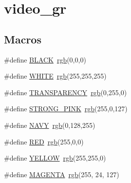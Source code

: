 \hypertarget{group__video__gr}{}\section{video\+\_\+gr}
\label{group__video__gr}
\subsection*{Macros}
\begin{DoxyCompactItemize}
\item 
\#define \hyperlink{group__video__gr_ga7b3b25cba33b07c303f3060fe41887f6}{B\+L\+A\+CK}~\hyperlink{group__video__gr_gafcc897567998ed3a26974926501a4abd}{rgb}(0,0,0)
\item 
\#define \hyperlink{group__video__gr_ga87b537f5fa5c109d3c05c13d6b18f382}{W\+H\+I\+TE}~\hyperlink{group__video__gr_gafcc897567998ed3a26974926501a4abd}{rgb}(255,255,255)
\item 
\#define \hyperlink{group__video__gr_gad2cbbe762a1a1175055cf68cd586adc1}{T\+R\+A\+N\+S\+P\+A\+R\+E\+N\+CY}~\hyperlink{group__video__gr_gafcc897567998ed3a26974926501a4abd}{rgb}(0,255,0)
\item 
\#define \hyperlink{group__video__gr_ga1dd918deb1dda207fd2665e93b575e36}{S\+T\+R\+O\+N\+G\+\_\+\+P\+I\+NK}~\hyperlink{group__video__gr_gafcc897567998ed3a26974926501a4abd}{rgb}(255,0,127)
\item 
\#define \hyperlink{group__video__gr_gab2ee9bdede8e3af96ff696c7b2ba7416}{N\+A\+VY}~\hyperlink{group__video__gr_gafcc897567998ed3a26974926501a4abd}{rgb}(0,128,255)
\item 
\#define \hyperlink{group__video__gr_ga8d23feea868a983c8c2b661e1e16972f}{R\+ED}~\hyperlink{group__video__gr_gafcc897567998ed3a26974926501a4abd}{rgb}(255,0,0)
\item 
\#define \hyperlink{group__video__gr_gabf681265909adf3d3e8116c93c0ba179}{Y\+E\+L\+L\+OW}~\hyperlink{group__video__gr_gafcc897567998ed3a26974926501a4abd}{rgb}(255,255,0)
\item 
\#define \hyperlink{group__video__gr_ga6f699060902f800f12aaae150f3a708e}{M\+A\+G\+E\+N\+TA}~\hyperlink{group__video__gr_gafcc897567998ed3a26974926501a4abd}{rgb}(255, 24, 127)
\end{DoxyCompactItemize}
